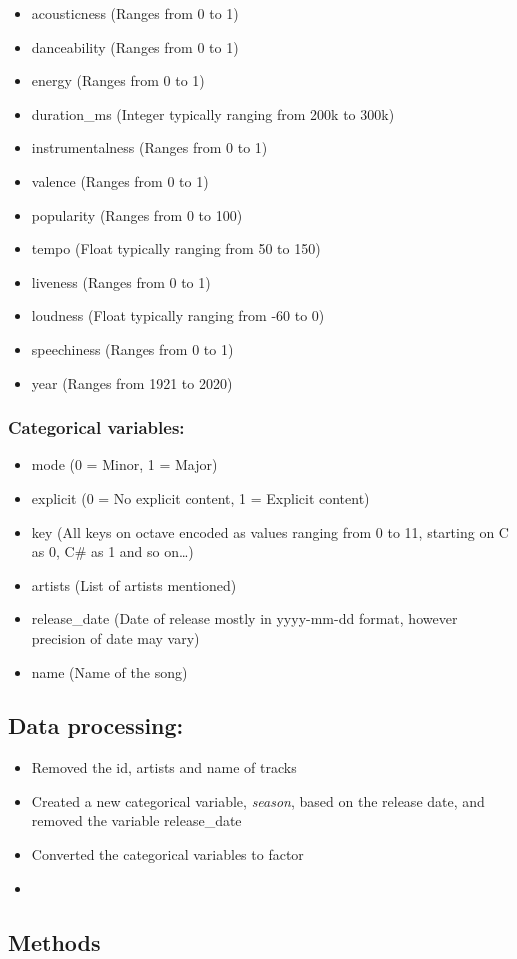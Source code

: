 \documentclass[
]{article}
\providecommand{\tightlist}{%
  \setlength{\itemsep}{0pt}\setlength{\parskip}{0pt}}
\begin{document}
\begin{itemize}
\tightlist
\item
  acousticness (Ranges from 0 to 1)
\item
  danceability (Ranges from 0 to 1)
\item
  energy (Ranges from 0 to 1)
\item
  duration\_ms (Integer typically ranging from 200k to 300k)
\item
  instrumentalness (Ranges from 0 to 1)
\item
  valence (Ranges from 0 to 1)
\item
  popularity (Ranges from 0 to 100)
\item
  tempo (Float typically ranging from 50 to 150)
\item
  liveness (Ranges from 0 to 1)
\item
  loudness (Float typically ranging from -60 to 0)
\item
  speechiness (Ranges from 0 to 1)
\item
  year (Ranges from 1921 to 2020)
\end{itemize}

\hypertarget{categorical-variables}{%
\subsubsection{Categorical variables:}\label{categorical-variables}}

\begin{itemize}
\tightlist
\item
  mode (0 = Minor, 1 = Major)
\item
  explicit (0 = No explicit content, 1 = Explicit content)
\item
  key (All keys on octave encoded as values ranging from 0 to 11,
  starting on C as 0, C\# as 1 and so on\ldots)
\item
  artists (List of artists mentioned)
\item
  release\_date (Date of release mostly in yyyy-mm-dd format, however
  precision of date may vary)
\item
  name (Name of the song)
\end{itemize}

\hypertarget{data-processing}{%
\subsection{Data processing:}\label{data-processing}}

\begin{itemize}
\tightlist
\item
  Removed the id, artists and name of tracks
\item
  Created a new categorical variable, \emph{season}, based on the
  release date, and removed the variable release\_date\\
\item
  Converted the categorical variables to factor
\item
\end{itemize}

\hypertarget{methods}{%
\subsection{Methods}\label{methods}}
\end{document}
